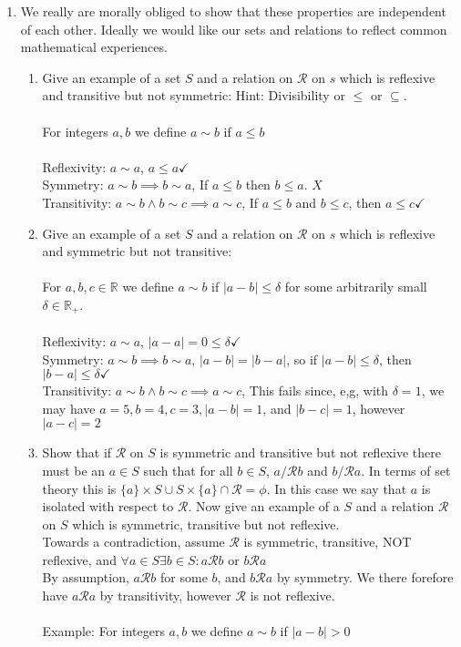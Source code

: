 \documentclass[11pt]{article}
\begin{document}
\begin{enumerate}
\newpage %
\item We really are morally obliged to show that these properties are independent of each other. Ideally we would like our sets and relations to reflect common mathematical experiences.
\begin{enumerate}
\item Give an example of a set $S$ and a relation on $\mathcal{R}$ on $s$ which is reflexive and transitive but not symmetric: Hint: Divisibility or $\leq$ or $\subseteq$.
\\
\\
For integers $a, b$ we define $a \sim b$ if $a \leq b$\\
\\Reflexivity: $a \sim a$, $a \leq a \checkmark$
\\Symmetry: $a \sim b \implies b \sim a$, If $a \leq b$ then $b \leq a$. $X$ 
\\Transitivity: $a \sim b \wedge b \sim c \implies a \sim c$, If $a \leq b$ and $b \leq c$, then $a \leq c \checkmark$
\\
\item Give an example of a set $S$ and a relation on $\mathcal{R}$ on $s$ which is reflexive and symmetric but not transitive:\\
\\
For $a,b,c \in \mathbb{R}$ we define $a \sim b$ if $|a - b| \leq \delta$ for some arbitrarily small $\delta \in \mathbb{R}_+$.
\\
\\Reflexivity: $a \sim a$, $|a-a| = 0 \leq \delta \checkmark$
\\Symmetry: $a \sim b \implies b \sim a$, $|a-b| = |b-a|$, so if $|a-b| \leq \delta$, then $|b-a| \leq \delta  \checkmark$
\\Transitivity: $a \sim b \wedge b \sim c \implies a \sim c$, This fails since, e,g, with $\delta = 1$, we may have $a = 5, b = 4, c = 3, |a-b| = 1$, and $|b-c| = 1$, however $|a-c| = 2$
\item Show that if $\mathcal{R}$ on $S$ is symmetric and transitive but not reflexive there must be an $a \in S$ such that for all $b \in S$, $a /\mathcal{R} b$ and $b  /\mathcal{R} a$. In terms of set theory this is $\{a\} \times S \cup S \times \{a\} \cap \mathcal{R} = \phi$. In this case we say that $a$ is isolated with respect to $\mathcal{R}$. Now give an example of a $S$ and a relation $\mathcal{R}$ on $S$ which is symmetric, transitive but not reflexive.
\\
Towards a contradiction, assume $\mathcal{R}$ is symmetric, transitive, NOT reflexive, and $\forall a \in S \exists b \in S: a\mathcal{R}b$ or $b\mathcal{R}a$
\\
By assumption, $a \mathcal{R} b$ for some $b$, and $b \mathcal{R} a$ by symmetry.  We there forefore have $a \mathcal{R} a$ by transitivity, however $\mathcal{R}$ is not reflexive.
\\
\\
Example: For integers $a,b$ we define $a \sim b$ if $|a-b| > 0$
\end{enumerate}


\end{enumerate}
\end{document}
